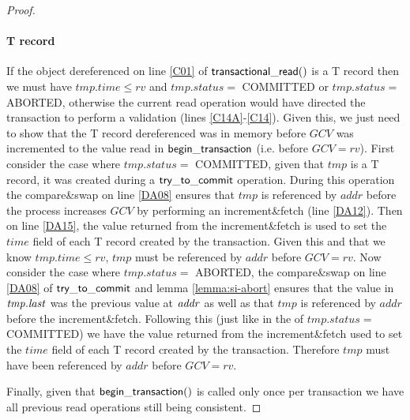 \begin{proof}
\paragraph{T record} If the object dereferenced on line \ref{C01} of $\sf{transactional\_read}()$ is a T record then we must have $\mathit{tmp.time} \leq \mathit{rv}$ and 
$\mathit{tmp.status} = $ COMMITTED or $\mathit{tmp.status} = $ ABORTED, otherwise the current read operation would have directed the transaction
to perform a validation (lines \ref{C14A}-\ref{C14}).
Given this, we just need to show that the T record dereferenced was in memory before $\mathit{GCV}$ was incremented to the value
read in $\sf{begin\_transaction}$ (i.e. before $\mathit{GCV} = \mathit{rv}$).
First consider the case where $\mathit{tmp.status} = $ COMMITTED, given that $\mathit{tmp}$ is a T record, it was created
during a $\sf{try\_to\_commit}$ operation.
During this operation  the compare\&swap on line \ref{DA08} ensures  that $\mathit{tmp}$ is referenced by $\mathit{addr}$ before the process
increases $\mathit{GCV}$ by performing an increment\&fetch (line \ref{DA12}).
Then on line \ref{DA15}, the value returned from the increment\&fetch is used to set the $\mathit{time}$ field of each T record
created by the transaction.
Given this and that we know $\mathit{tmp.time} \leq \mathit{rv}$, $\mathit{tmp}$ must be referenced by $\mathit{addr}$ before
$\mathit{GCV} = \mathit{rv}$.
Now consider the case where $\mathit{tmp.status} = $ ABORTED, the compare\&swap on line \ref{DA08} of $\sf{try\_to\_commit}$ and lemma \ref{lemma:si-abort} ensures
that the value in $\ms{tmp.last}$ was the previous value at $\ms{addr}$ as well as that $\mathit{tmp}$ is referenced by $\mathit{addr}$
before the increment\&fetch.
Following this (just like in the of $\mathit{tmp.status} = $ COMMITTED) we have the value returned from the increment\&fetch
used to set the $\mathit{time}$ field of each T record created by the transaction.
Therefore $\mathit{tmp}$ must have been referenced by $\mathit{addr}$ before $\mathit{GCV} = \mathit{rv}$.

Finally, given that $\sf{begin\_transaction}()$ is called only once per transaction
we have all previous read operations still being consistent.
\end{proof}




